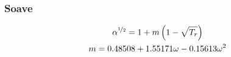 \subsubsection{Soave\cite{soave}}

\begin{gather}
	\alpha^{\nicefrac{1}{2}} = 1 + m \left(1-\sqrt{T_r}\right)\\
	m = 0.48508+1.55171\omega-0.15613\omega^2
\end{gather}